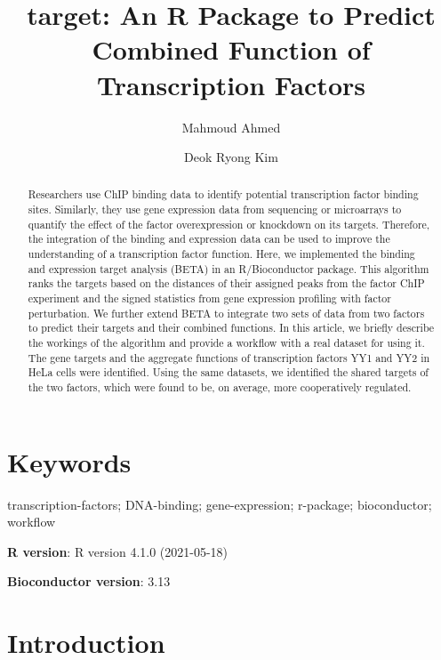 \documentclass[9pt,a4paper,]{extarticle}
\begin{document}
\pagestyle{front}

\title{target: An R Package to Predict Combined Function of Transcription Factors}

\author[1]{Mahmoud Ahmed}
\author[1]{Deok Ryong Kim}

\maketitle
\thispagestyle{front}

\begin{abstract}
Researchers use ChIP binding data to identify potential transcription factor binding sites. Similarly, they use gene expression data from sequencing or microarrays to quantify the effect of the factor overexpression or knockdown on its targets. Therefore, the integration of the binding and expression data can be used to improve the understanding of a transcription factor function. Here, we implemented the binding and expression target analysis (BETA) in an R/Bioconductor package. This algorithm ranks the targets based on the distances of their assigned peaks from the factor ChIP experiment and the signed statistics from gene expression profiling with factor perturbation. We further extend BETA to integrate two sets of data from two factors to predict their targets and their combined functions. In this article, we briefly describe the workings of the algorithm and provide a workflow with a real dataset for using it. The gene targets and the aggregate functions of transcription factors YY1 and YY2 in HeLa cells were identified. Using the same datasets, we identified the shared targets of the two factors, which were found to be, on average, more cooperatively regulated.
\end{abstract}

\section*{Keywords}
transcription-factors; DNA-binding; gene-expression; r-package; bioconductor; workflow


\clearpage
\pagestyle{main}

\textbf{R version}: R version 4.1.0 (2021-05-18)

\textbf{Bioconductor version}: 3.13

\hypertarget{introduction}{%
\section{Introduction}\label{introduction}}
\end{document}
